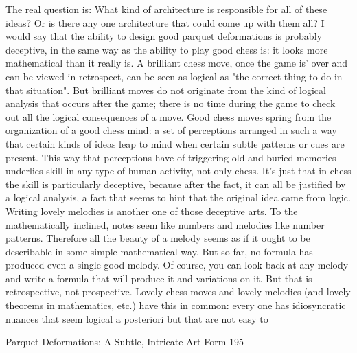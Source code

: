         The real question is: What kind of architecture is responsible for all of these
ideas? Or is there any one architecture that could come up with them all? I would say that
the ability to design good parquet deformations is probably deceptive, in the same way as
the ability to play good chess is: it looks more mathematical than it really is.
        A brilliant chess move, once the game is' over and can be viewed in retrospect,
can be seen as logical-as "the correct thing to do in that situation". But brilliant moves do
not originate from the kind of logical analysis that occurs after the game; there is no time
during the game to check out all the logical consequences of a move. Good chess moves
spring from the organization of a good chess mind: a set of perceptions arranged in such a
way that certain kinds of ideas leap to mind when certain subtle patterns or cues are
present. This way that perceptions have of triggering old and buried memories underlies
skill in any type of human activity, not only chess. It's just that in chess the skill is
particularly deceptive, because after the fact, it can all be justified by a logical analysis, a
fact that seems to hint that the original idea came from logic.
        Writing lovely melodies is another one of those deceptive arts. To the
mathematically inclined, notes seem like numbers and melodies like number patterns.
Therefore all the beauty of a melody seems as if it ought to be describable in some simple
mathematical way. But so far, no formula has produced even a single good melody. Of
course, you can look back at any melody and write a formula that will produce it and
variations on it. But that is retrospective, not prospective. Lovely chess moves and lovely
melodies (and lovely theorems in mathematics, etc.) have this in common: every one has
idiosyncratic nuances that seem logical a posteriori but that are not easy to




Parquet Deformations: A Subtle, Intricate Art Form                                         195

